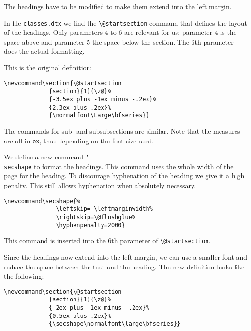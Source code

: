 \documentclass[twoside,a4paper]{refart}
\DeclareRobustCommand\cs[1]{\texttt{\char`\\#1}}
\begin{document}
The headings have to be modified to make them extend into the left 
margin.

In file \texttt{classes.dtx} we find the \verb|\@startsection| command 
that defines the layout of the headings. Only parameters 4 to 6 are 
relevant for us: parameter 4 is the space above and parameter 5 the 
space below the section. The 6th parameter does the actual formatting.

This is the original definition:\nopagebreak
\begin{verbatim}
\newcommand\section{\@startsection
             {section}{1}{\z@}%
             {-3.5ex plus -1ex minus -.2ex}%
             {2.3ex plus .2ex}%
             {\normalfont\Large\bfseries}}
\end{verbatim}

The commands for sub- and subsubsections are similar. Note that the 
measures are all in \texttt{ex}, thus depending on the font size used.

We define a new command \cs{secshape} to format the headings. This 
command uses the whole width of the page for the heading. To discourage 
hyphenation of the heading we give it a high penalty. This still 
allows hyphenation when absolutely necessary.

\begin{verbatim}
\newcommand\secshape{%
               \leftskip=-\leftmarginwidth%
               \rightskip=\@flushglue%
               \hyphenpenalty=2000}
\end{verbatim}

This command is inserted into the 6th parameter of \verb|\@startsection|.

Since the headings now extend into the left margin, we can use a 
smaller font and reduce the space between the text and the heading. The 
new definition looks like the following:\nopagebreak
\begin{verbatim}
\newcommand\section{\@startsection
             {section}{1}{\z@}%
             {-2ex plus -1ex minus -.2ex}%
             {0.5ex plus .2ex}%
             {\secshape\normalfont\large\bfseries}}
\end{verbatim}

\vspace{0pt plus 1cm}
\end{document}
